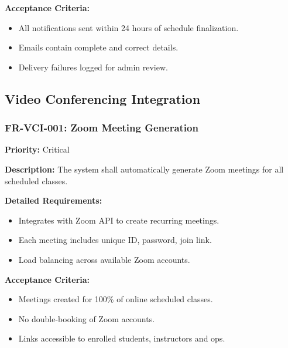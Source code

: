 \textbf{Acceptance Criteria:}
\begin{itemize}
    \item All notifications sent within 24 hours of schedule finalization.
    \item Emails contain complete and correct details.
    \item Delivery failures logged for admin review.
\end{itemize}

\subsection{Video Conferencing Integration}

\subsubsection{FR-VCI-001: Zoom Meeting Generation}
\textbf{Priority:} Critical  

\textbf{Description:} The system shall automatically generate Zoom meetings for all scheduled classes.

\textbf{Detailed Requirements:}
\begin{itemize}
    \item Integrates with Zoom API to create recurring meetings.
    \item Each meeting includes unique ID, password, join link.
    \item Load balancing across available Zoom accounts.
\end{itemize}

\textbf{Acceptance Criteria:}
\begin{itemize}
    \item Meetings created for 100\% of online scheduled classes.
    \item No double-booking of Zoom accounts.
    \item Links accessible to enrolled students, instructors and ops.
\end{itemize}




